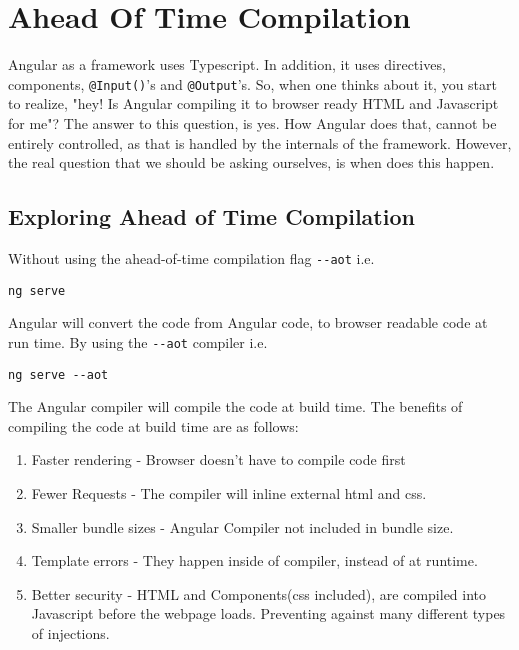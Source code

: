 \chapter{ Ahead Of Time Compilation }
Angular as a framework uses Typescript. In addition, it uses directives, components, 
\lstinline{@Input()}'s and \lstinline{@Output}'s. So, when one thinks about it, you 
start to realize, "hey! Is Angular compiling it to browser ready HTML and Javascript 
for me"? The answer to this question, is yes. How Angular does that, cannot be entirely 
controlled, as that is handled by the internals of the framework. However, the 
real question that we should be asking ourselves, is when does this happen. 

\section{Exploring Ahead of Time Compilation}
Without using the ahead-of-time compilation flag \lstinline{--aot} i.e. 
\begin{verbatim}
ng serve
\end{verbatim}

Angular will convert the code from Angular code, to browser readable 
code at run time. By using the \lstinline{--aot} compiler i.e.
\begin{verbatim}
ng serve --aot
\end{verbatim}

The Angular compiler will compile the code at build time. The benefits 
of compiling the code at build time are as follows: 
\begin{enumerate}
\item Faster rendering - Browser doesn't have to compile code first
\item Fewer Requests - The compiler will inline external html and css.
\item Smaller bundle sizes - Angular Compiler not included in bundle size. 
\item Template errors - They happen inside of compiler, instead of at runtime.
\item Better security - HTML and Components(css included), are compiled into 
Javascript before the webpage loads. Preventing against many different types
of injections. 
\end{enumerate}